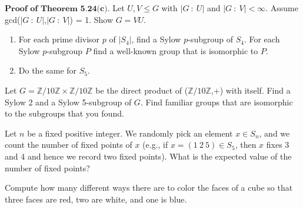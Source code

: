 \documentclass[12pt,letterpaper,boxed]{hmcpset}
\begin{document}

\begin{problem}[5.2.15]
$ \textbf{Proof of Theorem 5.24(c).} $ Let $ U,V \leq G $ with $ |G \ : \ U| $ and $ |G \ : \ V| < \infty $. Assume gcd($|G \ : \ U|$,$|G \ : \ V|$) = 1.  Show $ G = VU $.
\end{problem}

\begin{solution}

\end{solution}

\clearpage

\begin{problem}[7.2.3]
\begin{enumerate}[label=\alph*]
\item For each prime divisor $p$ of $|S_4|$, find a Sylow $p$-subgroup of $S_4$. For each Sylow $p$-subgroup $P$ find a well-known group that is isomorphic to $P$.
\item Do the same for $S_5$.
\end{enumerate}

\end{problem}

\begin{solution}
\end{solution}

\clearpage

\begin{problem}[7.2.4]
Let $ G = \mathbb{Z}/10\mathbb{Z} \times \mathbb{Z}/10\mathbb{Z} $ be the direct product of ($\mathbb{Z}/10\mathbb{Z}$,+) with itself. Find a Sylow 2 and a Sylow 5-subgroup of $G$.  Find familiar groups that are isomorphic to the subgroups that you found.
\end{problem}

\begin{solution}
\end{solution}

\clearpage


\begin{problem}[8.1.3]
Let $n$ be a fixed positive integer. We randomly pick an element $ x \in S_n $, and we count the number of fixed points of $ x $ (e.g., if $ x = (1 \ 2 \ 5) \in S_5 $, then $x$ fixes 3 and 4 and hence we record two fixed points). What  is the expected value of the number of fixed points?
\end{problem}

\begin{solution}
\end{solution}

\clearpage

\begin{problem}[8.2.1]
Compute how many different ways there are to color the faces of a cube so that three faces are red, two are white, and one is blue. 
\end{problem}

\begin{solution}

\end{solution}
\end{document}
